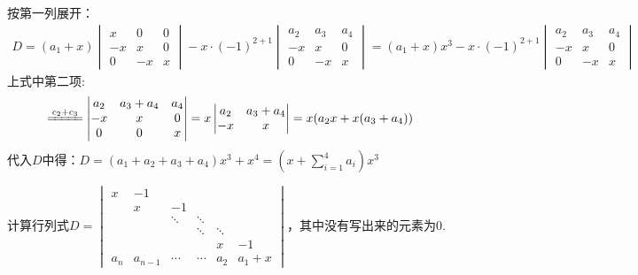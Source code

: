 \documentclass[a4paper]{report}
\begin{document}
\begin{jie}
按第一列展开：
\begin{align*}
D=
(a_1+x)
\begin{vmatrix}
x&0&0\\
-x&x&0\\
0&-x&x
\end{vmatrix}-x\cdot(-1)^{2+1}
\begin{vmatrix}
a_2&a_3&a_4\\
-x&x&0\\
0&-x&x
\end{vmatrix}=(a_1+x)x^3-x\cdot(-1)^{2+1}
\begin{vmatrix}
a_2&a_3&a_4\\
-x&x&0\\
0&-x&x
\end{vmatrix}
\end{align*}
上式中第二项:
\begin{equation*}
\xlongequal{c_2+c_3}\begin{vmatrix}
a_2&a_3+a_4&a_4\\
-x&x&0\\
0&0&x
\end{vmatrix}=x
\begin{vmatrix}
a_2&a_3+a_4\\
-x&x
\end{vmatrix}=x(a_2x+x(a_3+a_4))
\end{equation*}
代入$D$中得：$D=(a_1+a_2+a_3+a_4)x^3+x^4=\left(x+\sum\limits_{i=1}^{4}a_i\right)x^3$
\end{jie}

\EX 计算行列式$
D=
\begin{vmatrix}
x&-1\\
&x&-1\\
&&\ddots&\ddots\\
&&&\ddots&\ddots\\
&&&&x&-1\\
a_{n}&a_{n-1}&\cdots&\cdots&a_2&a_1+x
\end{vmatrix}
$，其中没有写出来的元素为0.
\end{document}
